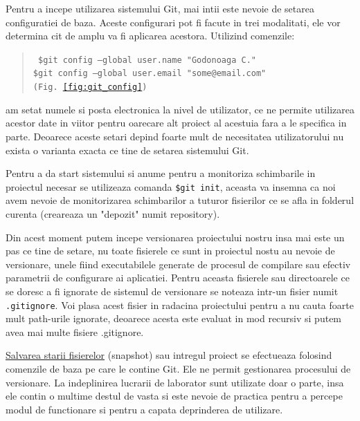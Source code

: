 Pentru a incepe utilizarea sistemului Git, mai intii este nevoie de setarea configuratiei de baza. Aceste configurari pot fi facute in trei modalitati, ele vor determina cit de amplu va fi aplicarea acestora.
Utilizind comenzile:
\begin{quote}\tt
	\$git config --global user.name "Godonoaga C."\\
	\$git config --global user.email "some@email.com" \hfill(Fig.~\ref{fig:git_config})
\end{quote}
am setat numele si posta electronica la nivel de utilizator, ce ne permite utilizarea acestor date in viitor pentru oarecare alt proiect al acestuia fara a le specifica in parte.
Deoarece aceste setari depind foarte mult de necesitatea utilizatorului nu exista o varianta exacta ce tine de setarea sistemului Git.

Pentru a da start sistemului si anume pentru a monitoriza schimbarile in proiectul necesar se utilizeaza comanda {\tt \$git init}, aceasta va insemna ca noi avem nevoie de monitorizarea schimbarilor a tuturor fisierilor ce se afla in folderul curenta (creareaza un "depozit" numit repository).

Din acest moment putem incepe versionarea proiectului nostru insa mai este un pas ce tine de setare, nu toate fisierele ce sunt in proiectul nostu au nevoie de versionare, unele fiind executabilele generate de procesul de compilare sau efectiv parametrii de configurare ai aplicatiei. Pentru aceasta fisierele sau directoarele ce se doresc a fi ignorate de sistemul de versionare se noteaza intr-un fisier numit {\tt.gitignore}. Voi plasa acest fisier in radacina proiectului pentru a nu cauta foarte mult path-urile ignorate, deoarece acesta este evaluat in mod recursiv si putem avea mai multe fisiere .gitignore.

\underline{Salvarea starii fisierelor} (snapshot) sau intregul proiect se efectueaza folosind comenzile de baza pe care le contine Git. Ele ne permit gestionarea procesului de versionare. La indeplinirea lucrarii de laborator sunt utilizate doar o parte, insa ele contin o multime destul de vasta si este nevoie de practica pentru a percepe modul de functionare si pentru a capata deprinderea de utilizare.


